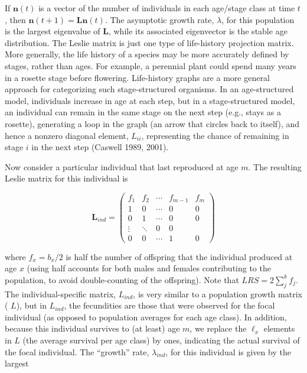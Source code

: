 \documentclass{article}
\begin{document}
If  $ \mathbf{n}(t) $ is a vector of the number of individuals in each age/stage class at time  $ t $, then  $ \mathbf{n}(t+1) = \mathbf{L}\mathbf{n}(t) $. The asymptotic growth rate,  $ \lambda $, for this population is the largest eigenvalue of  $ \mathbf{L} $, while its associated eigenvector is the stable age distribution. The Leslie matrix is just one type of life-history projection matrix. More generally, the life history of a species may be more accurately defined by stages, rather than ages. For example, a perennial plant could spend many years in a rosette stage before flowering. Life-history graphs are a more general approach for categorizing such stage-structured organisms. In an age-structured model, individuals increase in age at each step, but in a stage-structured model, an individual can remain in the same stage on the next step (e.g., stays as a rosette), generating a loop in the graph (an arrow that circles back to itself), and hence a nonzero diagonal element,  $ L_{ii} $, representing the chance of remaining in stage  $ i $ in the next step (Caswell 1989, 2001).

Now consider a particular individual that last reproduced at age  $ m $. The resulting Leslie matrix for this individual is

\begin{equation}
\mathbf{L}_{i n d}=\begin{pmatrix}{{{f_{1}}}}&{{{f_{2}}}}&{{{\cdots}}}&{{{f_{m-1}}}}&{{{f_{m}}}} \\{{{1}}}&{{{0}}}&{{{\cdots}}}&{{{0}}}&{{{0}}} \\{{{0}}}&{{{1}}}&{{{\cdots}}}&{{{0}}}&{{{0}}} \\{{{\vdots}}}&{{{\ddots}}}&{{{0}}}&{{{0}}} \\{{{0}}}&{{{0}}}&{{{\cdots}}}&{{{1}}}&{{{0}}}\end{pmatrix}
\tag{29.3b}
\label{eq:29_3b}
\end{equation}

where  $ f_x = b_x / 2 $ is half the number of offspring that the individual produced at age  $ x $ (using half accounts for both males and females contributing to the population, to avoid double-counting of the offspring). Note that  $ LRS = 2 \sum_j^k f_j $. The individual-specific matrix,  $ L_{ind} $, is very similar to a population growth matrix ( $ L $), but in  $ L_{ind} $, the fecundities are those that were observed for the focal individual (as opposed to population averages for each age class). In addition, because this individual survives to (at least) age  $ m $, we replace the  $ \ell_x $ elements in  $ L $ (the average survival per age class) by ones, indicating the actual survival of the focal individual. The “growth” rate,  $ \lambda_{ind} $, for this individual is given by the largest
\end{document}
